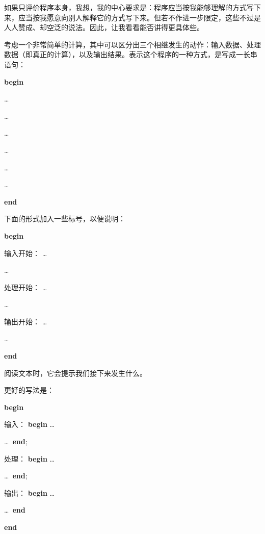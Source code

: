 如果只评价程序本身，我想，我的中心要求是：程序应当按我能够理解的方式写下来，应当按我愿意向别人解释它的方式写下来。但若不作进一步限定，这些不过是人人赞成、却空泛的说法。因此，让我看看能否讲得更具体些。

考虑一个非常简单的计算，其中可以区分出三个相继发生的动作：输入数据、处理数据（即真正的计算），以及输出结果。表示这个程序的一种方式，是写成一长串语句：

\noindent
\textbf{begin}

\noindent
\quad\dots

\noindent
\quad\dots

\noindent
\quad\dots

\noindent
\quad\dots

\noindent
\quad\dots

\noindent
\quad\dots

\noindent
\textbf{end}

下面的形式加入一些标号，以便说明：

\noindent
\tabto{10em}\textbf{begin}
\nopagebreak

\noindent
输入开始：\tabto{10em} \quad\dots
\nopagebreak

\noindent
\tabto{10em} \quad\dots

\noindent
处理开始：\tabto{10em} \quad\dots
\nopagebreak

\noindent
\tabto{10em} \quad\dots

\noindent
输出开始：\tabto{10em} \quad\dots
\nopagebreak

\noindent
\tabto{10em} \quad\dots

\noindent
\tabto{10em}\textbf{end}

\noindent
阅读文本时，它会提示我们接下来发生什么。

更好的写法是：

\noindent
\tabto{10em}\textbf{begin}
\nopagebreak

\noindent
输入：\tabto{10em} \quad\textbf{begin} \tabto{14em}\dots
\nopagebreak

\noindent
\tabto{13em} \quad\dots\ \textbf{end};

\noindent
处理：\tabto{10em} \quad\textbf{begin} \tabto{14em}\dots
\nopagebreak

\noindent
\tabto{13em} \quad\dots\ \textbf{end};

\noindent
输出：\tabto{10em} \quad\textbf{begin} \tabto{14em}\dots
\nopagebreak
\nopagebreak

\noindent
\tabto{13em} \quad\dots\ \textbf{end}
\nopagebreak

\noindent
\tabto{10em}\textbf{end}

